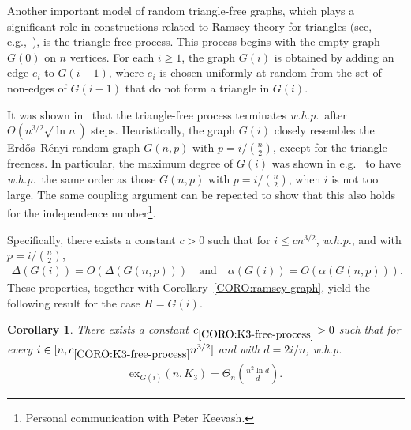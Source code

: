 \documentclass[11pt,a4paper]{article}
\newtheorem{corollary}[definition]{Corollary}
\newcommand{\graph}{H}
\begin{document}
Another important model of random triangle-free graphs, which plays a significant role in constructions related to Ramsey theory for triangles (see, e.g.,~\cite{Boh09,FGGM20,BK21}), is the triangle-free process.  This process begins with the empty graph $G(0)$ on $n$ vertices. 
For each $i \ge 1$, the graph $G(i)$ is obtained by adding an edge $e_i$ to $G(i-1)$, where $e_i$ is chosen uniformly at random from the set of non-edges of $G(i-1)$ that do not form a triangle in $G(i)$.

It was shown in~\cite{Boh09,FGGM20,BK21} that the triangle-free process terminates \textit{w.h.p.}~after $\Theta(n^{3/2} \sqrt{\ln n})$ steps. 
Heuristically, the graph $G(i)$ closely resembles the Erd\H{o}s--R\'{e}nyi random graph $G(n,p)$ with $p = i/\binom{n}{2}$, except for the triangle-freeness. 
In particular, the maximum degree of $G(i)$ was shown in e.g.~\cite[Section~3.2]{BK21} to have \textit{w.h.p.}~the same order as those $G(n,p)$ with $p = i/\binom{n}{2}$, when $i$ is not too large. The same coupling argument can be repeated to show that this also holds for the independence number\footnote{Personal communication with Peter Keevash.}. 



Specifically, there exists a constant $c> 0$ such that for $i \le c n^{3/2}$, \textit{w.h.p.}, and with $p = i/\binom{n}{2}$, 
\begin{align*}
    \Delta(G(i)) = O\left(\Delta(G(n,p))\right)
    \quad\text{and}\quad 
    \alpha(G(i)) = O\left(\alpha(G(n,p))\right).
\end{align*}
%
These properties, together with Corollary~\ref{CORO:ramsey-graph}, yield the following result for the case $\graph = G(i)$. 
%
\begin{corollary}\label{CORO:K3-free-process}
    There exists a constant $c_{\ref{CORO:K3-free-process}} > 0$ such that for every $i \in [n, c_{\ref{CORO:K3-free-process}} n^{3/2}]$ and with $d = 2i/n$,  \textit{w.h.p.}
    \begin{align*}
        \mathrm{ex}_{G(i)}(n, K_{3}) 
        = \Theta_{n}\left(\frac{n^2 \ln d}{d}\right).
    \end{align*}
\end{corollary}
\end{document}
